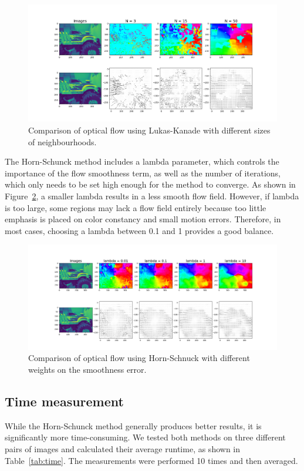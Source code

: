 \documentclass[9pt]{IEEEtran}
\begin{document}
\begin{figure}[h]
    \centering
    \includegraphics[width=1\columnwidth]{figures/LK_params.png}
    \caption{Comparison of optical flow using Lukas-Kanade with different sizes of neighbourhoods.}
    \label{fig:Lk_params}
\end{figure}

The Horn-Schunck method includes a lambda parameter, which controls the importance of the flow smoothness 
term, as well as the number of iterations, which only needs to be set high enough for the method to 
converge.
As shown in Figure~\ref{fig:HS_params}, a smaller lambda results in a less smooth flow field. However, 
if lambda is too large, some regions may lack a flow field entirely because too little emphasis is placed 
on color constancy and small motion errors. Therefore, in most cases, choosing a lambda between 0.1 and 1
 provides a good balance.


 \begin{figure}[h]
    \centering
    \includegraphics[width=1\columnwidth]{figures/HS_params.png}
    \caption{Comparison of optical flow using Horn-Schnuck with different weights on the smoothness error.}
    \label{fig:HS_params}
\end{figure}

\subsection{Time measurement}
While the Horn-Schunck method generally produces better results, it is significantly more time-consuming. 
We tested both methods on three different pairs of images and calculated their average runtime, as shown 
in Table~\ref{tab:time}. The measurements were performed 10 times and then averaged.
\end{document}

